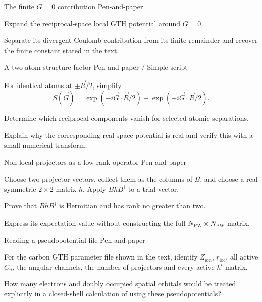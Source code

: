 \begin{exci}{The finite $G=0$ contribution \hfill\textnormal{\small Pen-and-paper}}
    \item Expand the reciprocal-space local GTH potential around $G=0$.
    \item Separate its divergent Coulomb contribution from its finite
    remainder and recover the finite constant stated in the text.
\end{exci}

\begin{exci}{A two-atom structure factor \hfill\textnormal{\small Pen-and-paper / Simple script}}
    \item For identical atoms at $\pm\vec{R}/2$, simplify
    \begin{equation*}
        S(\vec{G})=
        \exp(-i\vec{G}\cdot\vec{R}/2)
        +\exp(+i\vec{G}\cdot\vec{R}/2).
    \end{equation*}
    \item Determine which reciprocal components vanish for selected atomic
    separations.
    \item Explain why the corresponding real-space potential is real and
    verify this with a small numerical transform.
\end{exci}

\begin{exci}{Non-local projectors as a low-rank operator \hfill\textnormal{\small Pen-and-paper}}
    \item Choose two projector vectors, collect them as the columns of $B$,
    and choose a real symmetric $2\times2$ matrix $h$. Apply $BhB^{\dagger}$
    to a trial vector.
    \item Prove that $BhB^{\dagger}$ is Hermitian and has rank no greater than
    two.
    \item Express its expectation value without constructing the full
    $N_{\textrm{PW}}\times N_{\textrm{PW}}$ matrix.
\end{exci}

\begin{exci}{Reading a pseudopotential file \hfill\textnormal{\small Pen-and-paper}}
    \item For the carbon GTH parameter file shown in the text, identify
    $Z_{\textrm{ion}}$, $r_{\textrm{loc}}$, all active $C_n$, the angular
    channels, the number of projectors and every active $h^l$ matrix.
    \item How many electrons and doubly occupied spatial orbitals would be
    treated explicitly in a closed-shell calculation of  using these
    pseudopotentials?
\end{exci}

